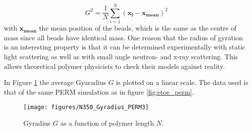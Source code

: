 \begin{equation}
    G^2 = \frac{1}{N} \sum_{i=1}^N \left( \mathbf{x_i} - \mathbf{x_{mean}} \right)^2
\end{equation}
with $\mathbf{x_{mean}}$ the mean position of the beads, which is the same as the centre of mass since all beads have identical mass. One reason that the radius of gyration is an interesting property is that it can be determined experimentally with static light scattering as well as with small angle neutron- and x-ray scattering. This allows theoretical polymer physicists to check their models against reality.\cite{grosberg1994}

In Figure \ref{fig:gyradius} the average Gyaradius $G$ is plotted on a linear scale. The data used is that of the same PERM simulation as in figure \ref{fig:etoe_perm}.

\begin{figure}[ht!]
\centering
\texttt{[image: figures/N350\_Gyradius\_PERM3]}
\caption{Gyradius $G$ as a function of polymer length $N$.}
\label{fig:gyradius}
\end{figure}